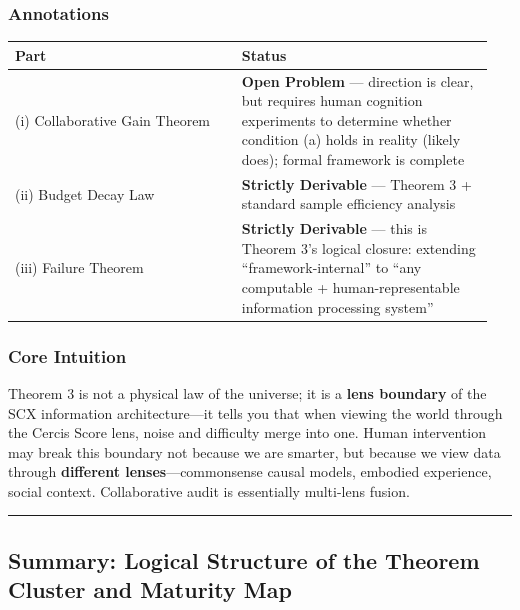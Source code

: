 \documentclass[
  12pt,
]{article}
\begin{document}
\subsubsection{Annotations}\label{hc-annotations}

\begin{longtable}[]{@{}p{0.45\linewidth}p{0.50\linewidth}@{}}
\toprule\noalign{}
\begin{minipage}[b]{\linewidth}\raggedright
Part
\end{minipage} & \begin{minipage}[b]{\linewidth}\raggedright
Status
\end{minipage} \\
\midrule\noalign{}
\endhead
\bottomrule\noalign{}
\endlastfoot
(i) Collaborative Gain Theorem & \textbf{Open Problem} --- direction is clear, but requires human cognition experiments to determine whether condition (a) holds in reality (likely does); formal framework is complete \\
(ii) Budget Decay Law & \textbf{Strictly Derivable} --- Theorem 3 + standard sample efficiency analysis \\
(iii) Failure Theorem & \textbf{Strictly Derivable} --- this is Theorem 3's logical closure: extending ``framework-internal'' to ``any computable + human-representable information processing system'' \\
\end{longtable}

\subsubsection{Core Intuition}\label{core-intuition-hc}

Theorem 3 is not a physical law of the universe; it is a \textbf{lens boundary} of the SCX information architecture---it tells you that when viewing the world through the Cercis Score lens, noise and difficulty merge into one. Human intervention may break this boundary not because we are smarter, but because we view data through \textbf{different lenses}---commonsense causal models, embodied experience, social context. Collaborative audit is essentially multi-lens fusion.

\begin{center}\rule{0.5\linewidth}{0.5pt}\end{center}

\subsection{Summary: Logical Structure of the Theorem Cluster and Maturity Map}\label{summary-next-theorems}
\end{document}

